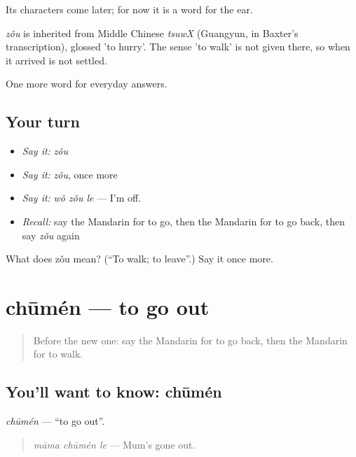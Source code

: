 Its characters come later; for now it is a word for the ear.

\begin{cousinweb}
\emph{zǒu} is inherited from Middle Chinese \emph{tsuwX} (Guangyun, in Baxter's transcription), glossed 'to hurry'. The sense 'to walk' is not given there, so when it arrived is not settled.
\end{cousinweb}

\begin{grammarlens}[title={What you've built}]
One more word for everyday answers.
\end{grammarlens}

\subsection*{Your turn}
\begin{itemize}
\raggedright
  \item \emph{Say it:} \emph{zǒu}
  \item \emph{Say it:} \emph{zǒu}, once more
  \item \emph{Say it:} \emph{wǒ zǒu le} — I'm off.
  \item \emph{Recall:} say the Mandarin for to go, then the Mandarin for to go back, then say \emph{zǒu} again
\end{itemize}

\begin{tcolorbox}[breakable,colback=teal!4,colframe=teal!35!black,title={Before you move on}]
What does zǒu mean? (\textquotedblleft{}To walk; to leave\textquotedblright{}.) Say it once more.
\end{tcolorbox}
\section[chūmén]{chūmén — to go out}

\label{lesson:ZH-C43-chumen}



\begin{quote}
Before the new one: say the Mandarin for to go back, then the Mandarin for to walk.
\end{quote}

\subsection*{You'll want to know: chūmén}
\emph{chūmén} — \textquotedblleft{}to go out\textquotedblright{}.

\begin{quote}
\emph{māma chūmén le} — Mum's gone out.
\end{quote}


